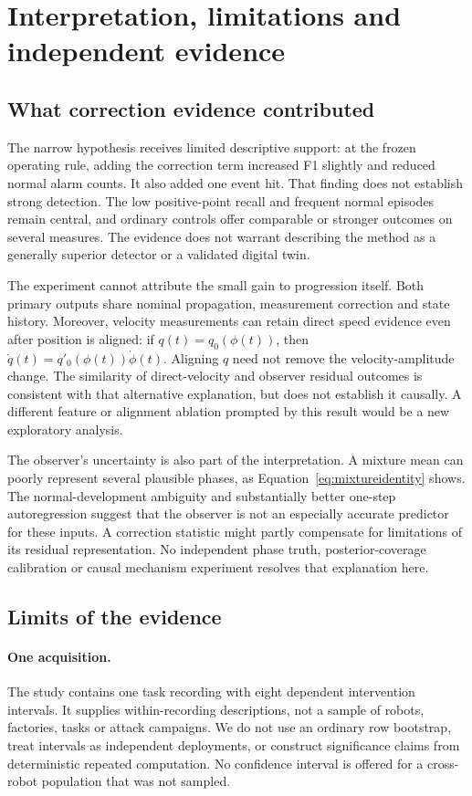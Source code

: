 \section{Interpretation, limitations and independent evidence}
\label{sec:discussion}
\subsection{What correction evidence contributed}
The narrow hypothesis receives limited descriptive support: at the frozen operating rule, adding the correction term increased F1 slightly and reduced normal alarm counts. It also added one event hit. That finding does not establish strong detection. The low positive-point recall and frequent normal episodes remain central, and ordinary controls offer comparable or stronger outcomes on several measures. The evidence does not warrant describing the method as a generally superior detector or a validated digital twin.

The experiment cannot attribute the small gain to progression itself. Both primary outputs share nominal propagation, measurement correction and state history. Moreover, velocity measurements can retain direct speed evidence even after position is aligned: if $q(t)=q_0(\phi(t))$, then $\dot q(t)=q'_0(\phi(t))\dot\phi(t)$. Aligning $q$ need not remove the velocity-amplitude change. The similarity of direct-velocity and observer residual outcomes is consistent with that alternative explanation, but does not establish it causally. A different feature or alignment ablation prompted by this result would be a new exploratory analysis.

The observer's uncertainty is also part of the interpretation. A mixture mean can poorly represent several plausible phases, as Equation~\eqref{eq:mixtureidentity} shows. The normal-development ambiguity and substantially better one-step autoregression suggest that the observer is not an especially accurate predictor for these inputs. A correction statistic might partly compensate for limitations of its residual representation. No independent phase truth, posterior-coverage calibration or causal mechanism experiment resolves that explanation here.

\subsection{Limits of the evidence}
\paragraph{One acquisition.} The study contains one task recording with eight dependent intervention intervals. It supplies within-recording descriptions, not a sample of robots, factories, tasks or attack campaigns. We do not use an ordinary row bootstrap, treat intervals as independent deployments, or construct significance claims from deterministic repeated computation. No confidence interval is offered for a cross-robot population that was not sampled.

